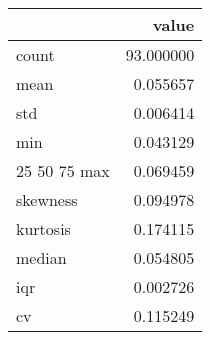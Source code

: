 \begin{tabular}{lr}
\toprule
 & value \\
\midrule
count & 93.000000 \\
mean & 0.055657 \\
std & 0.006414 \\
min & 0.043129 \\
25%
50%
75%
max & 0.069459 \\
skewness & 0.094978 \\
kurtosis & 0.174115 \\
median & 0.054805 \\
iqr & 0.002726 \\
cv & 0.115249 \\
\bottomrule
\end{tabular}
